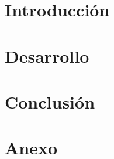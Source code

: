 \documentclass{rapportECL2024}
\begin{document}
\fairepagedegarde
\fairetabledesmatieres


\section{Introducción}

\newpage

\section{Desarrollo}

\newpage

\section{Conclusión}


\section{Anexo}
\end{document}
